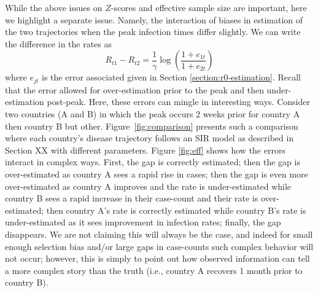 \documentclass[aoas]{amsart}
\begin{document}
While the above issues on $Z$-scores and effective sample size are important, here we highlight a separate issue.  Namely, the interaction of biases in estimation of the two trajectories when the peak infection times differ slightly.  We can write the difference in the rates as
$$
R_{t1} - R_{t2} = \frac{1}{\gamma} \log \left( \frac{1 + e_{1t}}{1+e_{2t}} \right)
$$
where $e_{jt}$ is the error associated given in Section \ref{section:r0-estimation}.  Recall that the error allowed for over-estimation prior to the peak and then under-estimation post-peak.  Here, these errors can mingle in interesting ways.  Consider two countries (A and B) in which the peak occurs 2 weeks prior for country A then country B but other.  Figure~\ref{fig:comparison} presents such a comparison where each country's disease trajectory follows an SIR model as described in Section XX with different parameters.  Figure \ref{fig:eff} shows how the errors interact in complex ways.  First, the gap is correctly estimated; then the gap is over-estimated as country A sees a rapid rise in cases; then the gap is even more over-estimated as country A improves and the rate is under-estimated while country B sees a rapid increase in their case-count and their rate is over-estimated; then country A's rate is correctly estimated while country B's rate is under-estimated as it sees improvement in infection rates; finally, the gap disappears.  We are not claiming this will always be the case, and indeed for small enough selection bias and/or large gaps in case-counts such complex behavior will not occur; however, this is simply to point out how observed information can tell a more complex story than the truth (i.e., country A recovers 1 month prior to country B).
\end{document}
